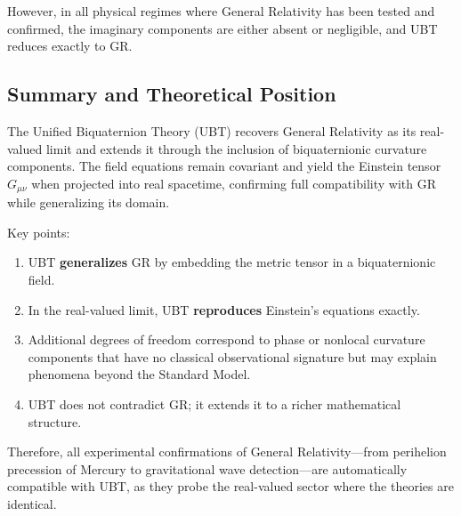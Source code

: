 However, in all physical regimes where General Relativity has been tested and confirmed, the imaginary components are either absent or negligible, and UBT reduces exactly to GR.

\subsection{Summary and Theoretical Position}

The Unified Biquaternion Theory (UBT) recovers General Relativity as its real-valued limit and extends it through the inclusion of biquaternionic curvature components. The field equations remain covariant and yield the Einstein tensor $G_{\mu\nu}$ when projected into real spacetime, confirming full compatibility with GR while generalizing its domain.

Key points:
\begin{enumerate}
  \item UBT \textbf{generalizes} GR by embedding the metric tensor in a biquaternionic field.
  \item In the real-valued limit, UBT \textbf{reproduces} Einstein's equations exactly.
  \item Additional degrees of freedom correspond to phase or nonlocal curvature components that have no classical observational signature but may explain phenomena beyond the Standard Model.
  \item UBT does not contradict GR; it extends it to a richer mathematical structure.
\end{enumerate}

Therefore, all experimental confirmations of General Relativity—from perihelion precession of Mercury to gravitational wave detection—are automatically compatible with UBT, as they probe the real-valued sector where the theories are identical.

